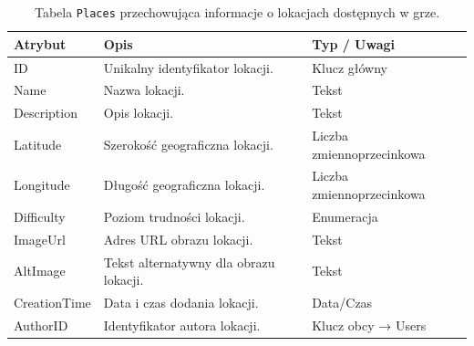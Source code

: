 \begin{table}[H]
  \centering
  \caption{Tabela \texttt{Places} przechowująca informacje o lokacjach dostępnych w grze.}
  \renewcommand{\arraystretch}{1.2}
  \begin{tabular}{|p{2.5cm}|p{6cm}|p{4cm}|}
    \hline
    \textbf{Atrybut} & \textbf{Opis}                          & \textbf{Typ / Uwagi}      \\ \hline
    ID               & Unikalny identyfikator lokacji.        & Klucz główny              \\ \hline
    Name             & Nazwa lokacji.                         & Tekst                     \\ \hline
    Description      & Opis lokacji.                          & Tekst                     \\ \hline
    Latitude         & Szerokość geograficzna lokacji.        & Liczba zmiennoprzecinkowa \\ \hline
    Longitude        & Długość geograficzna lokacji.          & Liczba zmiennoprzecinkowa \\ \hline
    Difficulty       & Poziom trudności lokacji.              & Enumeracja                \\ \hline
    ImageUrl         & Adres URL obrazu lokacji.              & Tekst                     \\ \hline
    AltImage         & Tekst alternatywny dla obrazu lokacji. & Tekst                     \\ \hline
    CreationTime     & Data i czas dodania lokacji.           & Data/Czas                 \\ \hline
    AuthorID         & Identyfikator autora lokacji.          & Klucz obcy → Users        \\ \hline
  \end{tabular}
\end{table}

